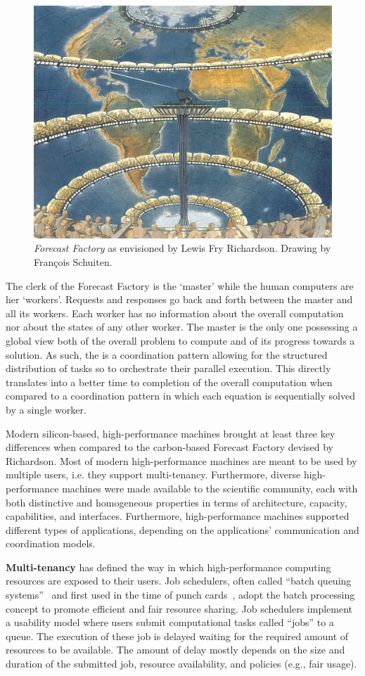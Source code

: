 \documentclass{sig-alternate}
\begin{document}
\begin{figure}[t]
  \centering
    \includegraphics[width=.45\textwidth]{figures/forecast-factory.jpg}
  \caption{\textit{Forecast Factory} as envisioned by Lewis Fry Richardson.
    Drawing by Fran{\c c}ois Schuiten.}
  \label{fig:figures_forecast-factory}
\end{figure}

The clerk of the Forecast Factory is the `master' while the human computers are
her `workers'. Requests and responses go back and forth between the master and
all its workers. Each worker has no information about the overall computation
nor about the states of any other worker. The master is the only one possessing
a global view both of the overall problem to compute and of its progress towards
a solution. As such, the {\bf \MW} is a coordination pattern allowing for the
structured distribution of tasks so to orchestrate their parallel execution.
This directly translates into a better time to completion of the overall
computation when compared to a coordination pattern in which each equation is
sequentially solved by a single worker.

Modern silicon-based, high-performance machines brought at least three key
differences when compared to the carbon-based Forecast Factory devised by
Richardson. Most of modern high-performance machines are meant to be used by
multiple users, i.e. they support multi-tenancy. Furthermore, diverse
high-performance machines were made available to the scientific community, each
with both distinctive and homogeneous properties in terms of architecture,
capacity, capabilities, and interfaces. Furthermore, high-performance machines
supported different types of applications, depending on the applications'
communication and coordination models.

{\bf Multi-tenancy} has defined the way in which high-performance computing
resources are exposed to their users. Job schedulers, often called ``batch
queuing systems''~\cite{czajkowski1998} and first used in the time of punch
cards~\cite{katz1966,silberschatz1998}, adopt the batch processing concept to
promote efficient and fair resource sharing. Job schedulers implement a
usability model where users submit computational tasks called ``jobs'' to a
queue. The execution of these job is delayed waiting for the required amount of
resources to be available. The amount of delay mostly depends on the size and
duration of the submitted job, resource availability, and policies (e.g., fair
usage).
\end{document}
